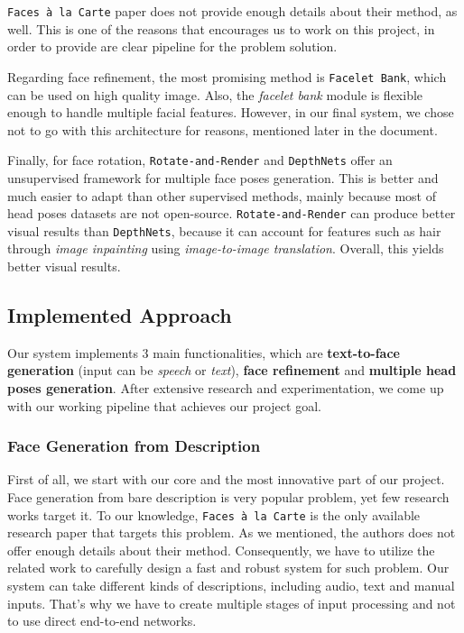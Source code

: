 \texttt{Faces à la Carte} paper does not provide enough details about their method, as well. This is one of the reasons that encourages us to work on this project, in order to provide are clear pipeline for the problem solution.

Regarding face refinement, the most promising method is \texttt{Facelet Bank}, which can be used on high quality image. Also, the \emph{facelet bank} module is flexible enough to handle multiple facial features. However, in our final system, we chose not to go with this architecture for reasons, mentioned later in the document.

Finally, for face rotation, \texttt{Rotate-and-Render} and \texttt{DepthNets} offer an unsupervised framework for multiple face poses generation. This is better and much easier to adapt than other supervised methods, mainly because most of head poses datasets are not open-source. \texttt{Rotate-and-Render} can produce better visual results than \texttt{DepthNets}, because it can account for features such as hair through \emph{image inpainting} using \emph{image-to-image translation}. Overall, this yields better visual results.

\subsection{Implemented Approach}
Our system implements $3$ main functionalities, which are \textbf{text-to-face generation} (input can be \emph{speech} or \emph{text}), \textbf{face refinement} and \textbf{multiple head poses generation}. After extensive research and experimentation, we come up with our working pipeline that achieves our project goal.

\subsubsection{Face Generation from Description}
First of all, we start with our core and the most innovative part of our project. Face generation from bare description is very popular problem, yet few research works target it. To our knowledge, \texttt{Faces à la Carte} is the only available research paper that targets this problem. As we mentioned, the authors does not offer enough details about their method. Consequently, we have to utilize the related work to carefully design a fast and robust system for such problem. 
Our system can take different kinds of descriptions, including audio, text and manual inputs. That's why we have to create multiple stages of input processing and not to use direct end-to-end networks. 

